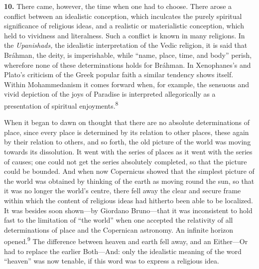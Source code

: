 \documentclass[12pt,a4paper]{book}
\newcommand{\opage}[1]{\marginnote{\footnotesize\textit{[#1]}}}
\begin{document}
\medskip

\noindent\textbf{10.} There came, however, the time when one had to choose.
There arose a conflict between an idealistic conception, which inculcates the
purely spiritual significance of religious ideas, and a realistic or
materialistic conception, which held to vividness and literalness. Such a
conflict is known in many religions. In the \emph{Upanishads,} the idealistic
interpretation of the Vedic religion, it is said that Bráhman, the deity, is
imperishable, while ``name, place, time, and body'' perish, wherefore none of
these determinations holds for Bráhman. In Xenophanes's and Plato's criticism
of the Greek popular faith a similar tendency shows itself. Within
Mohammedanism it comes forward when, for example, the sensuous and vivid
depiction of the joys of Paradise is interpreted allegorically as a
presentation of spiritual enjoyments.\textsuperscript{8}

When it began to dawn on thought that there are no absolute determinations of
place, since every place is determined by its relation to other places, these
again by their relation to others, and so forth, the old picture of the world
was moving towards its dissolution. It went with the series of places as it
went with the series of causes; one could not get the series absolutely
completed, so that the picture could be bounded. And when now Copernicus
showed that the simplest picture of the world was obtained by thinking of the
earth as moving round the sun, so that it was no longer the world's centre,
there fell away the clear and secure frame within which the content of
religious ideas had hitherto been able to be localized. It was besides soon
shown---by Giordano Bruno---that it was inconsistent to hold fast to the
limitation of ``the world'' when one accepted the relativity of all
determinations of place and the Copernican astronomy. An infinite horizon
opened.\textsuperscript{9} The difference between 
\opage{29}heaven and earth fell away,
and an Either---Or had to replace the earlier Both---And: only the idealistic
meaning of the word ``heaven'' was now tenable, if this word was to express a
religious idea.
\end{document}
